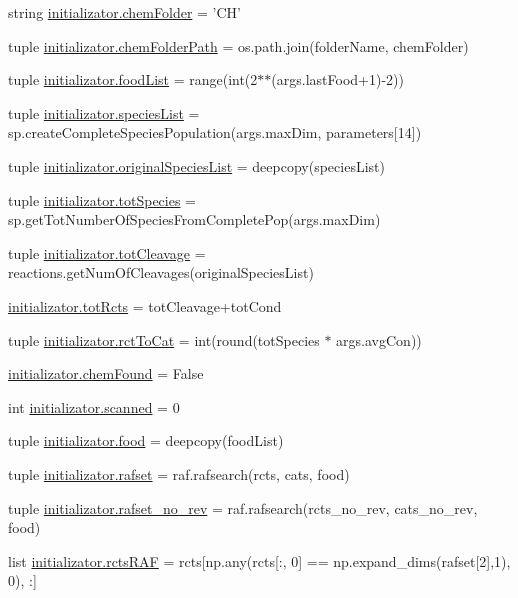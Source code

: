 \begin{DoxyCompactItemize}
\item 
string \hyperlink{a00137_a4a57e1e8a830824b985f34ee1af52b93}{initializator.\+chem\+Folder} = 'C\+H'
\item 
tuple \hyperlink{a00137_a633d7089af5a033807ccba3b7e9ad483}{initializator.\+chem\+Folder\+Path} = os.\+path.\+join(folder\+Name, chem\+Folder)
\item 
tuple \hyperlink{a00137_a402edf66e27aa29932e16311c9756b02}{initializator.\+food\+List} = range(int(2$\ast$$\ast$(args.\+last\+Food+1)-\/2))
\item 
tuple \hyperlink{a00137_a79af2b1d3fe38f2cd259cc56b1ecc5f3}{initializator.\+species\+List} = sp.\+create\+Complete\+Species\+Population(args.\+max\+Dim, parameters\mbox{[}14\mbox{]})
\item 
tuple \hyperlink{a00137_ab4024b0cf8a4136e81ae636c9cf6e0e4}{initializator.\+original\+Species\+List} = deepcopy(species\+List)
\item 
tuple \hyperlink{a00137_a7f8e1635318ca1aac728dd7165aa49b5}{initializator.\+tot\+Species} = sp.\+get\+Tot\+Number\+Of\+Species\+From\+Complete\+Pop(args.\+max\+Dim)
\item 
tuple \hyperlink{a00137_a517da3913f56e5216fa2c68818e04ecc}{initializator.\+tot\+Cleavage} = reactions.\+get\+Num\+Of\+Cleavages(original\+Species\+List)
\item 
\hyperlink{a00137_a1c0855f92c2dd2dd4a30f6624f6e1af0}{initializator.\+tot\+Rcts} = tot\+Cleavage+tot\+Cond
\item 
tuple \hyperlink{a00137_afee9c574290c862d3ad8a51a77b2a72e}{initializator.\+rct\+To\+Cat} = int(round(tot\+Species $\ast$ args.\+avg\+Con))
\item 
\hyperlink{a00137_acdd521d6bd1a71be37421dafd210de99}{initializator.\+chem\+Found} = False
\item 
int \hyperlink{a00137_afafc4f533cad86cb7fd1b6fe5ed9effa}{initializator.\+scanned} = 0
\item 
tuple \hyperlink{a00137_a4fe31b6cfa3dcaa4141be9282566fa7a}{initializator.\+food} = deepcopy(food\+List)
\item 
tuple \hyperlink{a00137_a1d1d6b79a11a2c646cdccd86ed33c06e}{initializator.\+rafset} = raf.\+rafsearch(rcts, cats, food)
\item 
tuple \hyperlink{a00137_a233edb9c8bdc6d737256db839206b8eb}{initializator.\+rafset\+\_\+no\+\_\+rev} = raf.\+rafsearch(rcts\+\_\+no\+\_\+rev, cats\+\_\+no\+\_\+rev, food)
\item 
list \hyperlink{a00137_af3ff3d6a780c5a5522cef529ea028654}{initializator.\+rcts\+R\+A\+F} = rcts\mbox{[}np.\+any(rcts\mbox{[}\+:, 0\mbox{]} == np.\+expand\+\_\+dims(rafset\mbox{[}2\mbox{]},1), 0), \+:\mbox{]}
$$
\end{DoxyCompactItemize}
